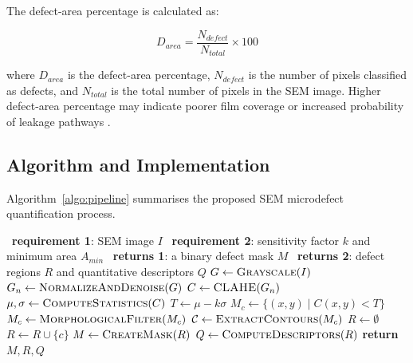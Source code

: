 \documentclass[pdflatex,sn-mathphys-num,iicol]{sn-jnl}
\theoremstyle{thmstyleone}
\theoremstyle{thmstyletwo}
\theoremstyle{thmstylethree}
\begin{document}
The defect-area percentage is calculated as:

\begin{equation}
D_{area} = \frac{N_{defect}}{N_{total}} \times 100
\label{eq:defect_area}
\end{equation}

where $D_{area}$ is the defect-area percentage, $N_{defect}$ is the
number of pixels classified as defects, and $N_{total}$ is the total
number of pixels in the SEM image. Higher defect-area percentage may
indicate poorer film coverage or increased probability of leakage
pathways \cite{chang2026,hu2023}.


\subsection{Algorithm and Implementation}\label{sec:algorithm}

Algorithm~\ref{algo:pipeline} summarises the proposed SEM microdefect
quantification process.

\begin{algorithm}
\caption{SEM microdefect quantification for perovskite photovoltaic films}
\label{algo:pipeline}
\begin{algorithmic}[1]
    \Statex \qquad \textbullet\ \textbf{requirement 1}: SEM image $I$
    \Statex \qquad \textbullet\ \textbf{requirement 2}: sensitivity factor $k$ and minimum area $A_{min}$
    \Statex \qquad \textbullet\ \textbf{returns 1}: a binary defect mask $M$
    \Statex \qquad \textbullet\ \textbf{returns 2}: defect regions $R$ and quantitative descriptors $Q$
    \State $G \gets \Call{Grayscale}{I}$
    \State $G_n \gets \Call{NormalizeAndDenoise}{G}$
    \State $C \gets \Call{CLAHE}{G_n}$ 
    \State $\mu, \sigma \gets \Call{ComputeStatistics}{C}$
    \State $T \gets \mu - k\sigma$ 
    \State $M_c \gets \{(x,y) \mid C(x,y) < T\}$
    \State $M_c \gets \Call{MorphologicalFilter}{M_c}$ 
    \State $\mathcal{C} \gets \Call{ExtractContours}{M_c}$
    \State $R \gets \emptyset$
            \State $R \gets R \cup \{c\}$
        \EndIf
    \EndFor
    \State $M \gets \Call{CreateMask}{R}$
    \State $Q \gets \Call{ComputeDescriptors}{R}$
    \State \textbf{return} $M, R, Q$
\EndFunction
\end{algorithmic}
\end{algorithm}
\end{document}
